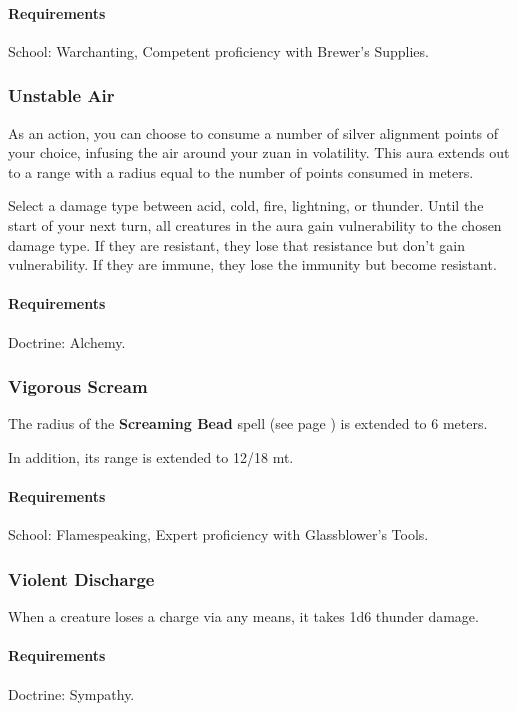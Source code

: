     \paragraph{Requirements} School: Warchanting, Competent proficiency with Brewer's Supplies.
\subsubsection{Unstable Air} \label{feat::unstableair}
    As an action, you can choose to consume a number of silver alignment points of your choice, infusing the air around your zuan in volatility.
    This aura extends out to a range with a radius equal to the number of points consumed in meters.

    Select a damage type between acid, cold, fire, lightning, or thunder.
    Until the start of your next turn, all creatures in the aura gain vulnerability to the chosen damage type.
    If they are resistant, they lose that resistance but don't gain vulnerability.
    If they are immune, they lose the immunity but become resistant.
    \paragraph{Requirements} Doctrine: Alchemy.
\subsubsection{Vigorous Scream} \label{feat::vigorousscream}
    The radius of the \textbf{Screaming Bead} spell (see page \pageref{spell::screamingbead}) is extended to 6 meters.

    In addition, its range is extended to 12/18 mt.
    \paragraph{Requirements} School: Flamespeaking, Expert proficiency with Glassblower's Tools.
\subsubsection{Violent Discharge} \label{feat::violentdischarge}
    When a creature loses a charge via any means, it takes 1d6 thunder damage.
    \paragraph{Requirements} Doctrine: Sympathy.

\newpage~\newpage
